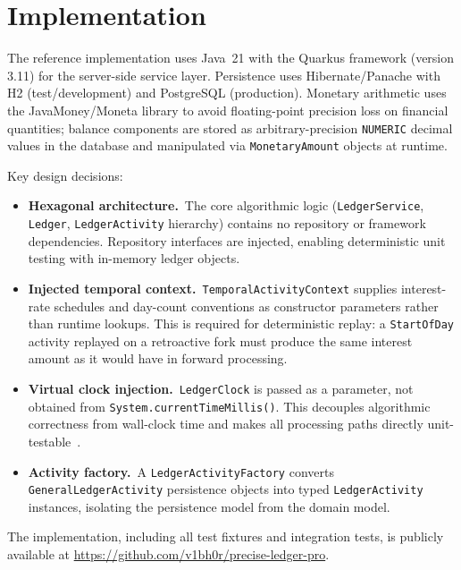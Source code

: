 \documentclass[11pt,letterpaper]{article}
\begin{document}
\section{Implementation}
\label{sec:implementation}

The reference implementation uses Java~21 with the Quarkus framework
(version 3.11) for the server-side service layer. Persistence uses
Hibernate/Panache with H2 (test/development) and PostgreSQL (production).
Monetary arithmetic uses the JavaMoney/Moneta library to avoid
floating-point precision loss on financial quantities; balance components
are stored as arbitrary-precision \texttt{NUMERIC} decimal values in the
database and manipulated via \texttt{MonetaryAmount} objects at runtime.

Key design decisions:

\begin{itemize}
  \item \textbf{Hexagonal architecture.}~The core algorithmic logic
        (\texttt{LedgerService}, \texttt{Ledger}, \texttt{LedgerActivity}
        hierarchy) contains no repository or framework dependencies.
        Repository interfaces are injected, enabling deterministic unit
        testing with in-memory ledger objects.
  \item \textbf{Injected temporal context.}~\texttt{TemporalActivityContext}
        supplies interest-rate schedules and day-count conventions as
        constructor parameters rather than runtime lookups. This is
        required for deterministic replay: a \texttt{StartOfDay} activity
        replayed on a retroactive fork must produce the same interest
        amount as it would have in forward processing.
  \item \textbf{Virtual clock injection.}~\texttt{LedgerClock} is passed
        as a parameter, not obtained from \texttt{System.currentTimeMillis()}.
        This decouples algorithmic correctness from wall-clock time and
        makes all processing paths directly unit-testable~\cite{feathers2004}.
  \item \textbf{Activity factory.}~A \texttt{LedgerActivityFactory}
        converts \texttt{GeneralLedgerActivity} persistence objects into
        typed \texttt{LedgerActivity} instances, isolating the
        persistence model from the domain model.
\end{itemize}

The implementation, including all test fixtures and integration tests,
is publicly available at
\url{https://github.com/v1bh0r/precise-ledger-pro}.
\end{document}
